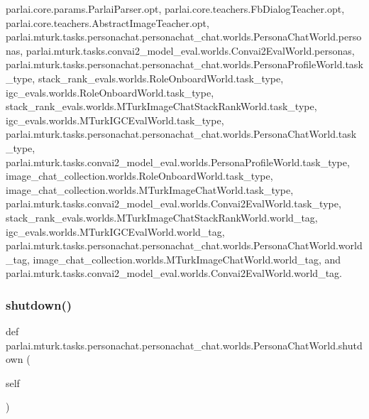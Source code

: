 parlai.\+core.\+params.\+Parlai\+Parser.\+opt, parlai.\+core.\+teachers.\+Fb\+Dialog\+Teacher.\+opt, parlai.\+core.\+teachers.\+Abstract\+Image\+Teacher.\+opt, parlai.\+mturk.\+tasks.\+personachat.\+personachat\+\_\+chat.\+worlds.\+Persona\+Chat\+World.\+personas, parlai.\+mturk.\+tasks.\+convai2\+\_\+model\+\_\+eval.\+worlds.\+Convai2\+Eval\+World.\+personas, parlai.\+mturk.\+tasks.\+personachat.\+personachat\+\_\+chat.\+worlds.\+Persona\+Profile\+World.\+task\+\_\+type, stack\+\_\+rank\+\_\+evals.\+worlds.\+Role\+Onboard\+World.\+task\+\_\+type, igc\+\_\+evals.\+worlds.\+Role\+Onboard\+World.\+task\+\_\+type, stack\+\_\+rank\+\_\+evals.\+worlds.\+M\+Turk\+Image\+Chat\+Stack\+Rank\+World.\+task\+\_\+type, igc\+\_\+evals.\+worlds.\+M\+Turk\+I\+G\+C\+Eval\+World.\+task\+\_\+type, parlai.\+mturk.\+tasks.\+personachat.\+personachat\+\_\+chat.\+worlds.\+Persona\+Chat\+World.\+task\+\_\+type, parlai.\+mturk.\+tasks.\+convai2\+\_\+model\+\_\+eval.\+worlds.\+Persona\+Profile\+World.\+task\+\_\+type, image\+\_\+chat\+\_\+collection.\+worlds.\+Role\+Onboard\+World.\+task\+\_\+type, image\+\_\+chat\+\_\+collection.\+worlds.\+M\+Turk\+Image\+Chat\+World.\+task\+\_\+type, parlai.\+mturk.\+tasks.\+convai2\+\_\+model\+\_\+eval.\+worlds.\+Convai2\+Eval\+World.\+task\+\_\+type, stack\+\_\+rank\+\_\+evals.\+worlds.\+M\+Turk\+Image\+Chat\+Stack\+Rank\+World.\+world\+\_\+tag, igc\+\_\+evals.\+worlds.\+M\+Turk\+I\+G\+C\+Eval\+World.\+world\+\_\+tag, parlai.\+mturk.\+tasks.\+personachat.\+personachat\+\_\+chat.\+worlds.\+Persona\+Chat\+World.\+world\+\_\+tag, image\+\_\+chat\+\_\+collection.\+worlds.\+M\+Turk\+Image\+Chat\+World.\+world\+\_\+tag, and parlai.\+mturk.\+tasks.\+convai2\+\_\+model\+\_\+eval.\+worlds.\+Convai2\+Eval\+World.\+world\+\_\+tag.

\mbox{\label{classparlai_1_1mturk_1_1tasks_1_1personachat_1_1personachat__chat_1_1worlds_1_1PersonaChatWorld_a86d1d4e599a470ec7f031c60b2fb0e61}} 
\subsubsection{\texorpdfstring{shutdown()}{shutdown()}}
{\footnotesize\ttfamily def parlai.\+mturk.\+tasks.\+personachat.\+personachat\+\_\+chat.\+worlds.\+Persona\+Chat\+World.\+shutdown (\begin{DoxyParamCaption}\item[{}]{self }\end{DoxyParamCaption})}



